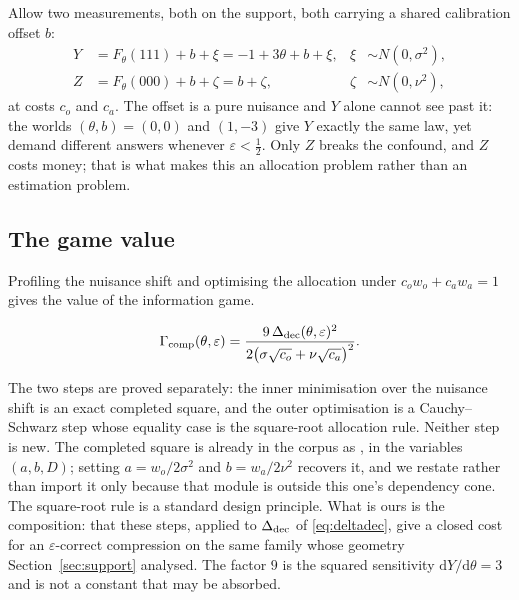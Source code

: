 Allow two measurements, both on the support, both carrying a shared calibration offset $b$:
\begin{equation}
\begin{aligned}
Y&=F_{\theta}(111)+b+\xi=-1+3\theta+b+\xi, &\xi&\sim N(0,\sigma^{2}),\\
Z&=F_{\theta}(000)+b+\zeta=b+\zeta, &\zeta&\sim N(0,\nu^{2}),
\end{aligned}
\label{eq:measurements}
\end{equation}
at costs $c_{o}$ and $c_{a}$. The offset is a pure nuisance and $Y$ alone cannot see past
it: the worlds $(\theta,b)=(0,0)$ and $(1,-3)$ give $Y$ exactly the same law, yet demand
different answers whenever $\varepsilon<\tfrac12$. Only $Z$ breaks the confound, and $Z$
costs money; that is what makes this an allocation problem rather than an estimation
problem.


\subsection{The game value}

Profiling the nuisance shift and optimising the allocation under
$c_{o}w_{o}+c_{a}w_{a}=1$ gives the value of the information game.

\begin{theorem}
\label{thm:gamma}
\begin{equation}
\Gamma_{\rm comp}(\theta,\varepsilon)
=\frac{9\,\Delta_{\rm dec}(\theta,\varepsilon)^{2}}
{2\bigl(\sigma\sqrt{c_{o}}+\nu\sqrt{c_{a}}\bigr)^{2}} .
\label{eq:gamma}
\end{equation}
\end{theorem}


The two steps are proved separately: the inner minimisation over the nuisance shift is an
exact completed square, and the outer optimisation is a Cauchy--Schwarz step whose equality
case is the square-root allocation rule. Neither step is new. The completed square is
already in the corpus as , in the
variables $(a,b,D)$; setting $a=w_{o}/2\sigma^{2}$ and $b=w_{a}/2\nu^{2}$ recovers it, and
we restate rather than import it only because that module is outside this one's dependency
cone. The square-root rule is a standard design principle. What is ours is the composition:
that these steps, applied to $\Delta_{\rm dec}$ of \eqref{eq:deltadec}, give a closed cost
for an $\varepsilon$-correct compression on the same family whose geometry
Section~\ref{sec:support} analysed. The factor $9$ is the squared sensitivity
$\mathrm{d}Y/\mathrm{d}\theta=3$ and is not a constant that may be absorbed.

